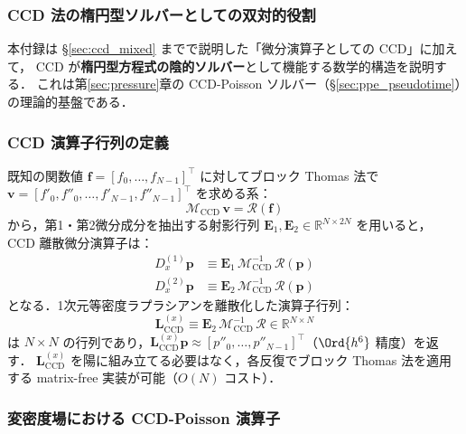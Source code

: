 \subsubsection{CCD 法の楕円型ソルバーとしての双対的役割}
\label{app:ccd_elliptic}

本付録は §\ref{sec:ccd_mixed} までで説明した「微分演算子としての CCD」に加えて，
CCD が\textbf{楕円型方程式の陰的ソルバー}として機能する数学的構造を説明する．
これは第\ref{sec:pressure}章の CCD-Poisson ソルバー（§\ref{sec:ppe_pseudotime}）の理論的基盤である．

\subsubsection{CCD 演算子行列の定義}

既知の関数値 $\bm{f} = [f_0, \dots, f_{N-1}]^\top$ に対してブロック Thomas 法で
$\bm{v} = [f'_0, f''_0, \dots, f'_{N-1}, f''_{N-1}]^\top$ を求める系：
\begin{equation}
  \mathcal{M}_{\mathrm{CCD}}\,\bm{v} = \mathcal{R}(\bm{f})
  \label{eq:ccd_derivative_system_app}
\end{equation}
から，第1・第2微分成分を抽出する射影行列 $\mathbf{E}_1, \mathbf{E}_2 \in \mathbb{R}^{N \times 2N}$ を用いると，
CCD 離散微分演算子は：
\begin{align}
  D_x^{(1)}\bm{p} &\equiv \mathbf{E}_1\,\mathcal{M}_{\mathrm{CCD}}^{-1}\,\mathcal{R}(\bm{p}) \\
  D_x^{(2)}\bm{p} &\equiv \mathbf{E}_2\,\mathcal{M}_{\mathrm{CCD}}^{-1}\,\mathcal{R}(\bm{p})
\end{align}
となる．1次元等密度ラプラシアンを離散化した演算子行列：
\begin{equation}
  \mathbf{L}_{\mathrm{CCD}}^{(x)} \equiv \mathbf{E}_2\,\mathcal{M}_{\mathrm{CCD}}^{-1}\,\mathcal{R}
  \in \mathbb{R}^{N \times N}
  \label{eq:L_CCD_def_app}
\end{equation}
は $N \times N$ の行列であり，$\mathbf{L}_{\mathrm{CCD}}^{(x)}\bm{p} \approx [p''_0, \dots, p''_{N-1}]^\top$（$\Ord{h^6}$ 精度）を返す．
$\mathbf{L}_{\mathrm{CCD}}^{(x)}$ を陽に組み立てる必要はなく，各反復でブロック Thomas 法を適用する matrix-free 実装が可能（$O(N)$ コスト）．

\subsubsection{変密度場における CCD-Poisson 演算子}

